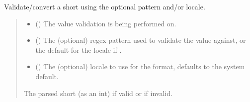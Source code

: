 \documentclass[letterpaper,10pt,english]{sphinxmanual}
\begin{document}
\begin{fulllineitems}
\begin{fulllineitems}
\begin{quote}
\begin{description}
\end{description}\end{quote}

\end{fulllineitems}


\begin{fulllineitems}
\label{\detokenize{apache_commons_validator_python.routines:apache_commons_validator_python.routines.short_validator.ShortValidator.validate}}
\pysigstartsignatures
{}
\pysigstopsignatures
\sphinxAtStartPar
Validate/convert a short using the optional pattern and/or locale.
\begin{quote}\begin{description}
\begin{itemize}
\item {} 
\sphinxAtStartPar
{} () \textendash{} The value validation is being performed on.

\item {} 
\sphinxAtStartPar
{} () \textendash{} The (optional) regex pattern used to validate the value against,
or the default for the locale if .

\item {} 
\sphinxAtStartPar
{} () \textendash{} The (optional) locale to use for the format, defaults to the system default.

\end{itemize}

\sphinxAtStartPar
The parsed short (as an int) if valid or  if invalid.

\end{description}\end{quote}

\end{fulllineitems}


\end{fulllineitems}
\end{document}
